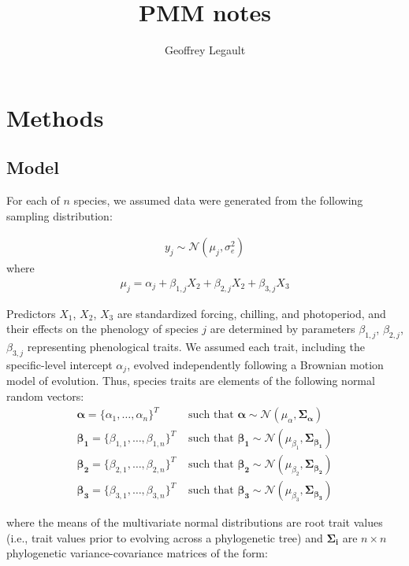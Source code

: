 \documentclass[12pt,a4paper]{article}
\title{PMM notes}
\author{Geoffrey Legault}
\begin{document}
\section*{Methods}

\subsection*{Model}

For each of $n$ species, we assumed data were generated from the following sampling distribution:

\begin{align}
  \label{modely}
  y_j \sim \mathcal{N}(\mu_j, \sigma_e^2)
\end{align}
where
\begin{align}
  \label{modelmu}
  \mu_j = \alpha_j + \beta_{1,j} X_2 + \beta_{2,j} X_2 + \beta_{3,j} X_3
\end{align}

Predictors $X_1$, $X_2$, $X_3$ are standardized forcing, chilling, and photoperiod, and their effects on the phenology of species $j$ are determined by parameters $\beta_{1,j}$, $\beta_{2,j}$, $\beta_{3,j}$ representing phenological traits. We assumed each trait, including the specific-level intercept $\alpha_j$, evolved independently following a Brownian motion model of evolution. Thus, species traits are elements of the following normal random vectors:
\begin{align}
  \boldsymbol{\alpha} = \{\alpha_1, \ldots, \alpha_n\}^T & \text{ such that }
  \boldsymbol{\alpha} \sim \mathcal{N}(\mu_{\alpha},\boldsymbol{\Sigma_{\alpha}}) \\
  \boldsymbol{\beta_1} =  \{\beta_{1,1}, \ldots, \beta_{1,n}\}^T & \text{ such that }
  \boldsymbol{\beta_1} \sim \mathcal{N}(\mu_{\beta_1},\boldsymbol{\Sigma_{\beta_1}}) \nonumber \\
  \boldsymbol{\beta_2} =  \{\beta_{2,1}, \ldots, \beta_{2,n}\}^T & \text{ such that }
  \boldsymbol{\beta_2} \sim \mathcal{N}(\mu_{\beta_2},\boldsymbol{\Sigma_{\beta_2}}) \nonumber \\
  \boldsymbol{\beta_3} =  \{\beta_{3,1}, \ldots, \beta_{3,n}\}^T & \text{ such that }
  \boldsymbol{\beta_3} \sim \mathcal{N}(\mu_{\beta_3},\boldsymbol{\Sigma_{\beta_3}}) \nonumber
\end{align}

\noindent where the means of the multivariate normal distributions are root trait values (i.e., trait values prior to evolving across a phylogenetic tree) and $\boldsymbol{\Sigma_i}$ are $n \times n$ phylogenetic variance-covariance matrices of the form: \\
\end{document}
